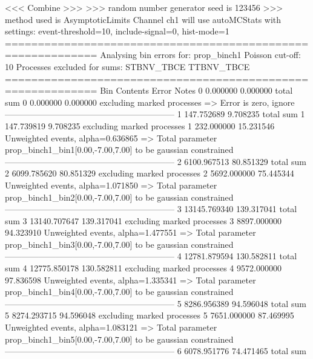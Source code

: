  <<< Combine >>> 
>>> random number generator seed is 123456
>>> method used is AsymptoticLimits
Channel ch1 will use autoMCStats with settings: event-threshold=10, include-signal=0, hist-mode=1
============================================================
Analysing bin errors for: prop_binch1
Poisson cut-off: 10
Processes excluded for sums: STBNV_TBCE TTBNV_TBCE
============================================================
Bin        Contents        Error           Notes                         
0          0.000000        0.000000        total sum                     
0          0.000000        0.000000        excluding marked processes    
  => Error is zero, ignore      
------------------------------------------------------------
1          147.752689      9.708235        total sum                     
1          147.739819      9.708235        excluding marked processes    
1          232.000000      15.231546       Unweighted events, alpha=0.636865
  => Total parameter prop_binch1_bin1[0.00,-7.00,7.00] to be gaussian constrained
------------------------------------------------------------
2          6100.967513     80.851329       total sum                     
2          6099.785620     80.851329       excluding marked processes    
2          5692.000000     75.445344       Unweighted events, alpha=1.071850
  => Total parameter prop_binch1_bin2[0.00,-7.00,7.00] to be gaussian constrained
------------------------------------------------------------
3          13145.769340    139.317041      total sum                     
3          13140.707647    139.317041      excluding marked processes    
3          8897.000000     94.323910       Unweighted events, alpha=1.477551
  => Total parameter prop_binch1_bin3[0.00,-7.00,7.00] to be gaussian constrained
------------------------------------------------------------
4          12781.879594    130.582811      total sum                     
4          12775.850178    130.582811      excluding marked processes    
4          9572.000000     97.836598       Unweighted events, alpha=1.335341
  => Total parameter prop_binch1_bin4[0.00,-7.00,7.00] to be gaussian constrained
------------------------------------------------------------
5          8286.956389     94.596048       total sum                     
5          8274.293715     94.596048       excluding marked processes    
5          7651.000000     87.469995       Unweighted events, alpha=1.083121
  => Total parameter prop_binch1_bin5[0.00,-7.00,7.00] to be gaussian constrained
------------------------------------------------------------
6          6078.951776     74.471465       total sum                     

